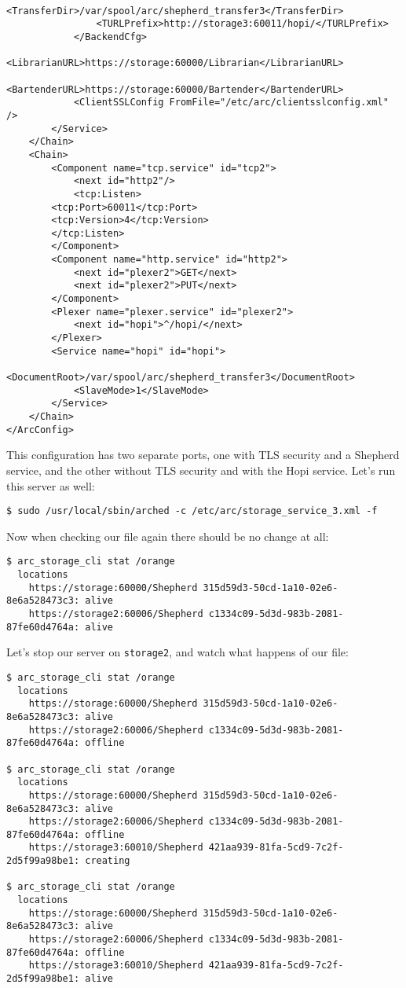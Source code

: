 \documentclass{book}
\begin{document}
\begin{verbatim}
                <TransferDir>/var/spool/arc/shepherd_transfer3</TransferDir>
                <TURLPrefix>http://storage3:60011/hopi/</TURLPrefix>
            </BackendCfg>
            <LibrarianURL>https://storage:60000/Librarian</LibrarianURL>
            <BartenderURL>https://storage:60000/Bartender</BartenderURL>
            <ClientSSLConfig FromFile="/etc/arc/clientsslconfig.xml" />
        </Service>
    </Chain>
    <Chain>
        <Component name="tcp.service" id="tcp2">
            <next id="http2"/> 
            <tcp:Listen>
		<tcp:Port>60011</tcp:Port>
		<tcp:Version>4</tcp:Version>
	    </tcp:Listen>
        </Component>
        <Component name="http.service" id="http2">
            <next id="plexer2">GET</next>
            <next id="plexer2">PUT</next>
        </Component>
        <Plexer name="plexer.service" id="plexer2">
            <next id="hopi">^/hopi/</next>
        </Plexer>
        <Service name="hopi" id="hopi">
            <DocumentRoot>/var/spool/arc/shepherd_transfer3</DocumentRoot>
            <SlaveMode>1</SlaveMode>
        </Service>
    </Chain>
</ArcConfig>    
\end{verbatim}

This configuration has two separate ports, one with TLS security and a Shepherd service, and the other without TLS security and with the Hopi service. Let's run this server as well:

\begin{verbatim}
$ sudo /usr/local/sbin/arched -c /etc/arc/storage_service_3.xml -f
\end{verbatim}

Now when checking our file again there should be no change at all:

\begin{verbatim}
$ arc_storage_cli stat /orange
  locations
    https://storage:60000/Shepherd 315d59d3-50cd-1a10-02e6-8e6a528473c3: alive
    https://storage2:60006/Shepherd c1334c09-5d3d-983b-2081-87fe60d4764a: alive
\end{verbatim}

Let's stop our server on \verb!storage2!, and watch what happens of our file:

\begin{verbatim}
$ arc_storage_cli stat /orange
  locations
    https://storage:60000/Shepherd 315d59d3-50cd-1a10-02e6-8e6a528473c3: alive
    https://storage2:60006/Shepherd c1334c09-5d3d-983b-2081-87fe60d4764a: offline
    
$ arc_storage_cli stat /orange
  locations
    https://storage:60000/Shepherd 315d59d3-50cd-1a10-02e6-8e6a528473c3: alive
    https://storage2:60006/Shepherd c1334c09-5d3d-983b-2081-87fe60d4764a: offline
    https://storage3:60010/Shepherd 421aa939-81fa-5cd9-7c2f-2d5f99a98be1: creating

$ arc_storage_cli stat /orange
  locations
    https://storage:60000/Shepherd 315d59d3-50cd-1a10-02e6-8e6a528473c3: alive
    https://storage2:60006/Shepherd c1334c09-5d3d-983b-2081-87fe60d4764a: offline
    https://storage3:60010/Shepherd 421aa939-81fa-5cd9-7c2f-2d5f99a98be1: alive
\end{verbatim}
\end{document}
